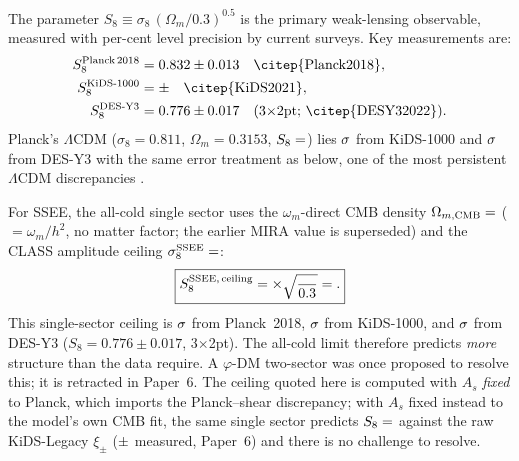 \documentclass[12pt,a4paper]{article}
\begin{document}
The parameter $S_8 \equiv \sigma_8\,(\Omega_m/0.3)^{0.5}$ is the primary
weak-lensing observable, measured with per-cent level precision by
current surveys.
Key measurements are:
\begin{align}
  S_8^{\mathrm{Planck\,2018}} &= 0.832 \pm 0.013 \quad\text{\citep{Planck2018}}, \\
  S_8^{\mathrm{KiDS\text{-}1000}} &= \val{S8_k1000_dato}\pm\val{S8_k1000_dato_sigma} \quad\text{\citep{KiDS2021}}, \\
  S_8^{\mathrm{DES\text{-}Y3}} &= 0.776 \pm 0.017 \quad\text{(3$\times$2pt; \citep{DESY32022})}.
\end{align}
Planck's $\Lambda$CDM ($\sigma_8=0.811$, $\Omega_m=0.3153$, $S_8=\val{p5_S8_lcdm}$) lies
$\val{p5_tS8_lcdm_kids}\sigma$ from KiDS-1000 and $\val{p5_tS8_lcdm_des}\sigma$ from DES-Y3 with the
same error treatment as below, one of the most persistent $\Lambda$CDM
discrepancies \citep{Weinberg2013}.

For SSEE, the all-cold single sector uses the $\omega_m$-direct CMB density
$\Omega_{m,\mathrm{CMB}} = \val{OMEGA_M_TOTAL_d6}$ ($=\omega_m/h^2$, no matter factor; the
earlier MIRA value is superseded) and the CLASS amplitude ceiling
$\sigma_8^{\mathrm{SSEE}} = \val{p3_sigma8_techo}$:
\begin{equation}
  \boxed{S_8^{\mathrm{SSEE,\,ceiling}}
    = \val{p3_sigma8_techo} \times \sqrt{\frac{\val{OMEGA_M_TOTAL_d6}}{0.3}}
    = \val{p3_S8_techo}.}
  \label{eq:S8_SSEE}
\end{equation}
This single-sector ceiling is $\val{tension_s8_planck_techo}\sigma$ from Planck~2018, $\val{tension_s8_kids1000_techo}\sigma$ from
KiDS-1000, and $\val{tension_s8_desy3_techo}\sigma$ from DES-Y3 ($S_8 = 0.776\pm0.017$, 3$\times$2pt).
The all-cold limit therefore predicts \emph{more} structure than the data
require. A $\varphi$-DM two-sector was once proposed to resolve this; it is
retracted in Paper~6. The ceiling quoted here is computed with $A_s$
\emph{fixed} to Planck, which imports the Planck--shear discrepancy; with
$A_s$ fixed instead to the model's own CMB fit, the same single sector predicts
$S_8=\val{S8_leg_pred}$ against the raw KiDS-Legacy $\xi_\pm$ ($\val{S8_legacy_dato}\pm\val{S8_legacy_dato_sigma}$ measured,
Paper~6) and there is no challenge to resolve.
\end{document}
